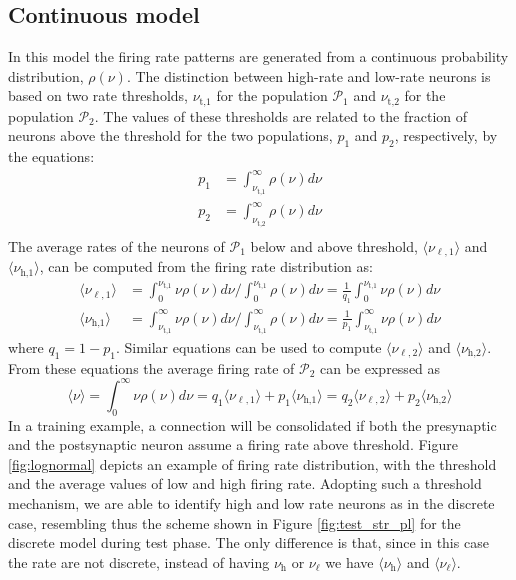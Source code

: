 \documentclass[a4paper, 12pt, twoside, openright]{book}
\newcommand{\popI}{\mathcal{P}_1}
\newcommand{\popII}{\mathcal{P}_2}
\newcommand{\rh}{\nu_\text{h}}
\newcommand{\rl}{\nu_{\ell}}
\newcommand{\rhI}{\nu_\text{h,1}}
\newcommand{\rlI}{\nu_{\ell,1}}
\newcommand{\rhII}{\nu_\text{h,2}}
\newcommand{\rlII}{\nu_{\ell,2}}
\newcommand{\rtI}{\nu_\text{t,1}}
\newcommand{\rtII}{\nu_\text{t,2}}
\begin{document}
\subsection{\label{subsubseq:rate-cont} Continuous model}
In this model the firing rate patterns are generated from a continuous probability distribution, $\rho(\nu)$.
The distinction between high-rate and low-rate neurons
is based on two rate thresholds, $\rtI$ for the population $\popI$ and $\rtII$ for the population $\popII$. The values of these thresholds are related to the fraction of neurons above the threshold for the two populations, $p_1$ and $p_2$, respectively, by the equations:
\begin{equation}
    \begin{split}
    p_1 &= \int_{\rtI}^{\infty} \rho (\nu) d\nu\\
    p_2 &= \int_{\rtII}^{\infty} \rho (\nu) d\nu\\
    \end{split}
\end{equation}
The average rates of the neurons of $\popI$ below and above threshold,
$\langle \rlI \rangle$ and $\langle \rhI \rangle$,
can be computed from the firing rate distribution as:
\begin{equation}
    \label{eq:av_rate_cont}
    \begin{split}
        \langle \rlI \rangle &= \int_{0}^{\rtI} \nu \rho (\nu) d\nu \Big/ \int_{0}^{\rtI} \rho (\nu) d\nu = \frac{1}{q_1}\int_{0}^{\rtI} \nu \rho (\nu) d\nu\\
        \langle \rhI \rangle &= \int_{\rtI}^{\infty} \nu \rho (\nu) d\nu \Big/ \int_{\rtI}^{\infty} \rho (\nu) d\nu = \frac{1}{p_1} \int_{\rtI}^{\infty} \nu \rho (\nu) d\nu
    \end{split}
\end{equation}
where $q_1 = 1- p_1$.
Similar equations can be used to compute
$\langle \rlII \rangle$ and $\langle \rhII \rangle$.
From these equations
the average firing rate of $\popII$ can be expressed as
\begin{equation}
    \langle \nu \rangle= 
    \int_{0}^{\infty} \nu \rho (\nu) d\nu
    = q_1 \langle \rlI \rangle + p_1 \langle \rhI \rangle 
    = q_2 \langle \rlII \rangle + p_2 \langle \rhII \rangle 
\end{equation}
In a training example, a connection will be consolidated if both the presynaptic and the postsynaptic neuron assume a firing rate above threshold.
Figure \ref{fig:lognormal} depicts an example of firing rate distribution, with the threshold and the average values of low and high firing rate. Adopting such a threshold mechanism, we are able to identify high and low rate neurons as in the discrete case, resembling thus the scheme shown in Figure \ref{fig:test_str_pl} for the discrete model during test phase. The only difference is that, since in this case the rate are not discrete, instead of having $\rh$ or $\rl$ we have $\langle \rh \rangle$ and $\langle \rl \rangle$.
\end{document}
